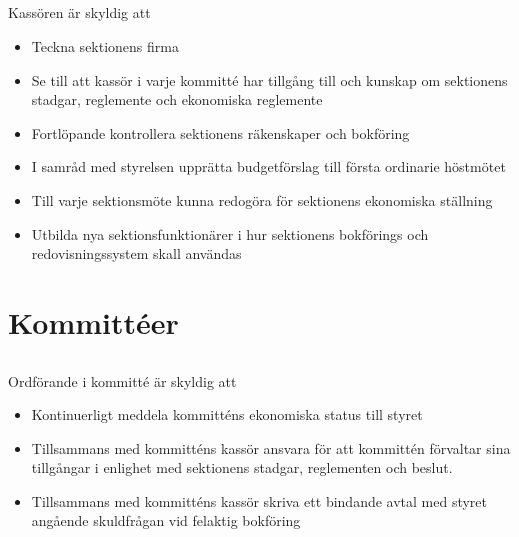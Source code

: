 \documentclass[a4paper, 10pt]{article}
\begin{document}
\subsection{}
Kassören är skyldig att
\begin{itemize}
  \item Teckna sektionens firma
  \item Se till att kassör i varje kommitté har tillgång till och kunskap om sektionens stadgar, reglemente och ekonomiska reglemente 
  \item Fortlöpande kontrollera sektionens räkenskaper och bokföring
  \item I samråd med styrelsen upprätta budgetförslag till första ordinarie höstmötet
  \item Till varje sektionsmöte kunna redogöra för sektionens ekonomiska ställning
  \item Utbilda nya sektionsfunktionärer i hur sektionens bokförings och redovisningssystem skall användas
\end{itemize}

\section{Kommittéer}
\label{sec:kommitteer}

\subsection{}
Ordförande i kommitté är skyldig att
\begin{itemize}
\item Kontinuerligt meddela kommitténs ekonomiska status till styret
\item Tillsammans med kommitténs kassör ansvara för att kommittén förvaltar sina tillgångar i enlighet med sektionens stadgar, reglementen och beslut.
\item Tillsammans med kommitténs kassör skriva ett bindande avtal med styret angående skuldfrågan vid felaktig bokföring
\end{itemize}
\end{document}
